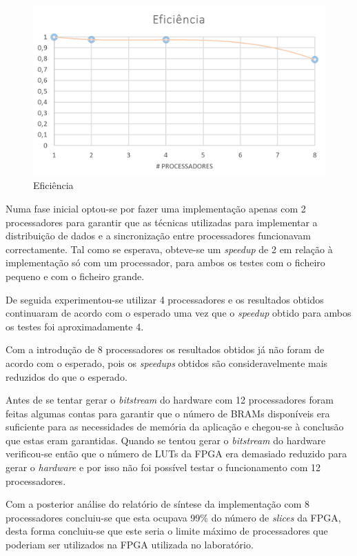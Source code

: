 \begin{figure}[H]
\centering
\includegraphics[width=140mm]{Eficiencia.PNG}
\caption{Eficiência \label{Eficiencia}}
\end{figure}

Numa fase inicial optou-se por fazer uma implementação apenas com 2 processadores para garantir que as técnicas utilizadas para implementar a distribuição de dados e a sincronização entre processadores funcionavam correctamente. Tal como se esperava, obteve-se um \textit{speedup} de 2 em relação à implementação só com um processador, para ambos os testes com o ficheiro pequeno e com o ficheiro grande.

De seguida experimentou-se utilizar 4 processadores e os resultados obtidos continuaram de acordo com o esperado uma vez que o \textit{speedup} obtido para ambos os testes foi aproximadamente 4.

Com a introdução de 8 processadores os resultados obtidos já não foram de acordo com o esperado, pois os \textit{speedups} obtidos são consideravelmente mais reduzidos do que o esperado.

Antes de se tentar gerar o \textit{bitstream} do hardware com 12 processadores foram feitas algumas contas para garantir que o número de BRAMs disponíveis era suficiente para as necessidades de memória da aplicação e chegou-se à conclusão que estas eram garantidas. Quando se tentou gerar o \textit{bitstream} do hardware verificou-se então que o número de LUTs da FPGA era demasiado reduzido para gerar o \textit{hardware} e por isso não foi possível testar o funcionamento com 12 processadores.

Com a posterior análise do relatório de síntese da implementação com 8 processadores concluiu-se que esta ocupava 99\% do número de \textit{slices} da FPGA, desta forma concluiu-se que este seria o limite máximo de processadores que poderiam ser utilizados na FPGA utilizada no laboratório.


